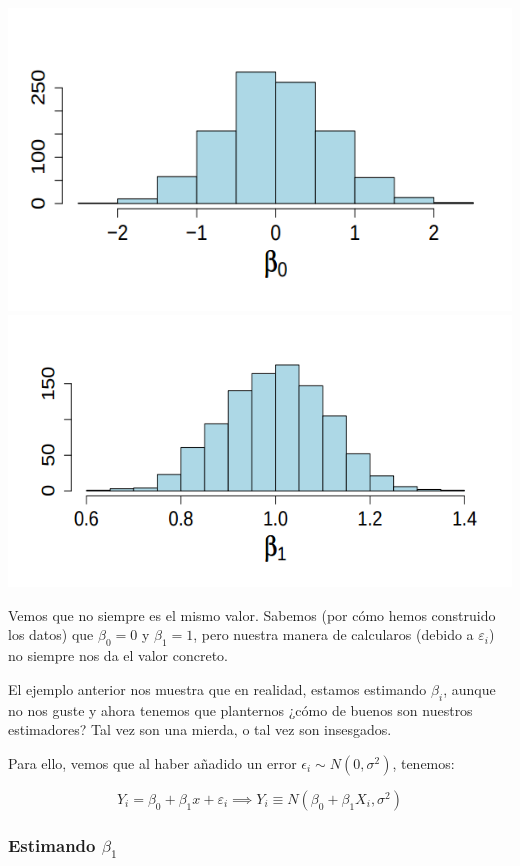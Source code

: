 \begin{example}
\begin{center}
\includegraphics[scale=0.3]{img/1000vecesb0.png}
\includegraphics[scale=0.3]{img/1000vecesb1.png}
\end{center}

Vemos que no siempre es el mismo valor. Sabemos (por cómo hemos construido los datos) que $β_0 = 0$ y $β_1 = 1$, pero nuestra manera de calcularos (debido a $ε_i$) no siempre nos da el valor concreto. 


\end{example}

El ejemplo anterior nos muestra que en realidad, estamos estimando $β_i$, aunque no nos guste y ahora tenemos que planternos ¿cómo de buenos son nuestros estimadores? Tal vez son una mierda, o tal vez son insesgados. 

Para ello, vemos que al haber añadido un error $\epsilon_i \sim N(0,σ^2)$, tenemos:

\[
Y_i = β_0 + β_1x + ε_i \implies Y_i \equiv N(β_0 + β_1X_i, σ^2)
\] 


\subsubsection{Estimando $β_1$}

